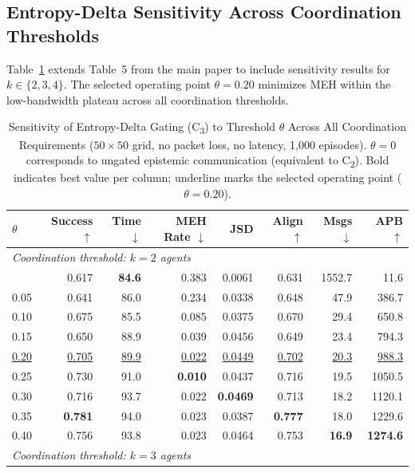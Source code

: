 \documentclass[pdflatex,sn-mathphys-num]{sn-jnl}%
\theoremstyle{thmstyleone}%
\theoremstyle{thmstyletwo}%
\theoremstyle{thmstylethree}%
\begin{document}
\begin{appendices}
\section{Entropy-Delta Sensitivity Across Coordination Thresholds}
Table~\ref{tab:appendix_delta} extends Table~5 from the main paper to include sensitivity results for $k \in \{2, 3, 4\}$. The selected operating point $\theta=0.20$ minimizes MEH within the low-bandwidth plateau across all coordination thresholds.

\begin{table}[htbp]
\centering
\caption{Sensitivity of Entropy-Delta Gating (C\textsubscript{3}) to Threshold $\theta$ Across All Coordination Requirements ($50\times50$ grid, no packet loss, no latency, 1{,}000 episodes). $\theta=0$ corresponds to ungated epistemic communication (equivalent to C\textsubscript{2}). Bold indicates best value per column; underline marks the selected operating point ($\theta=0.20$).}
\label{tab:appendix_delta}
\small
\begin{tabular}{lrrrrrrr}
\toprule
$\theta$ & Success $\uparrow$ & Time $\downarrow$ & MEH Rate $\downarrow$ & JSD & Align $\uparrow$ & Msgs $\downarrow$ & APB $\uparrow$ \\
\midrule
\multicolumn{8}{l}{\textit{Coordination threshold: $k=2$ agents}} \\
\addlinespace[2pt]
0.00 & 0.617 & \textbf{84.6} & 0.383 & 0.0061 & 0.631 & 1552.7 & 11.6 \\
0.05 & 0.641 & 86.0 & 0.234 & 0.0338 & 0.648 & 47.9 & 386.7 \\
0.10 & 0.675 & 85.5 & 0.085 & 0.0375 & 0.670 & 29.4 & 650.8 \\
0.15 & 0.650 & 88.9 & 0.039 & 0.0456 & 0.649 & 23.4 & 794.3 \\
\underline{0.20} & \underline{0.705} & \underline{89.9} & \underline{0.022} & \underline{0.0449} & \underline{0.702} & \underline{20.3} & \underline{988.3} \\
0.25 & 0.730 & 91.0 & \textbf{0.010} & 0.0437 & 0.716 & 19.5 & 1050.5 \\
0.30 & 0.716 & 93.7 & 0.022 & \textbf{0.0469} & 0.713 & 18.2 & 1120.1 \\
0.35 & \textbf{0.781} & 94.0 & 0.023 & 0.0387 & \textbf{0.777} & 18.0 & 1229.6 \\
0.40 & 0.756 & 93.8 & 0.023 & 0.0464 & 0.753 & \textbf{16.9} & \textbf{1274.6} \\
\midrule
\multicolumn{8}{l}{\textit{Coordination threshold: $k=3$ agents}} \\

\end{tabular}
\end{table}
\end{appendices}
\end{document}
